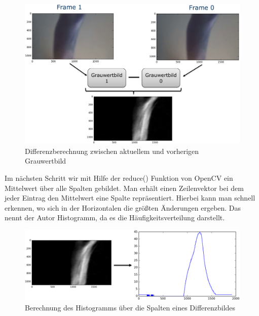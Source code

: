 \begin{figure}[ht!]
\centering
\includegraphics[width=\textwidth]{handcontrol/Bilder/diff_frame1-frame0.png}
\caption{Differenzberechnung zwischen aktuellem und vorherigen Grauwertbild}
\end{figure}

Im nächsten Schritt wir mit Hilfe der reduce() Funktion von OpenCV ein Mittelwert über alle Spalten gebildet. Man erhält einen Zeilenvektor bei dem jeder Eintrag den Mittelwert eine Spalte repräsentiert. Hierbei kann man schnell erkennen, wo sich in der Horizontalen die größten Änderungen ergeben. Das nennt der Autor Histogramm, da es die Häufigkeitsverteilung darstellt.

\begin{figure}[ht!]
\centering
\includegraphics[width=\textwidth]{handcontrol/Bilder/diff_frame_to_hist.png}
\caption{Berechnung des Histogramms über die Spalten eines Differenzbildes}
\end{figure}

